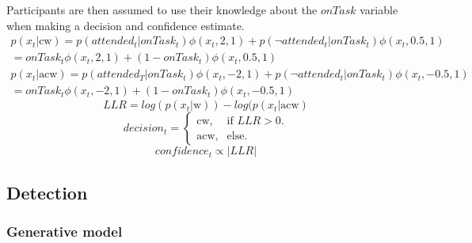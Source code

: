 \documentclass[12pt,twoside]{reedthesis}
\begin{document}
Participants are then assumed to use their knowledge about the \(onTask\) variable when making a decision and confidence estimate.
\begin{equation}
\begin{aligned}
    p(x_t | \text{cw}) = p(attended_t | onTask_t) \phi(x_t,2,1) + p(\neg attended_t | onTask_t) \phi(x_t,0.5,1)\\
    = onTask_t \phi(x_t,2,1) + (1-onTask_t) \phi(x_t,0.5,1)
    \end{aligned}
\end{equation}
\begin{equation}
\begin{aligned}
    p(x_t | \text{acw}) = p(attended_T | onTask_t) \phi(x_t,-2,1) + p(\neg attended_t | onTask_t) \phi(x_t,-0.5,1)\\
    = onTask_t \phi(x_t,-2,1) + (1-onTask_t) \phi(x_t,-0.5,1)
    \end{aligned}
\end{equation}
\begin{equation}
LLR = log(p(x_t | \text{w}))-log(p(x_t | \text{acw})
\end{equation}
\begin{equation}
  decision_t=\begin{cases}
    \text{cw}, & \text{if } LLR>0.\\
   \text{acw}, & \text{else}.
    
  \end{cases}
\end{equation}
\begin{equation}
confidence_t \propto |LLR|
\end{equation}
\hypertarget{detection-4}{%
\subsection{Detection}\label{detection-4}}

\hypertarget{generative-model-7}{%
\subsubsection*{Generative model}\label{generative-model-7}}
\end{document}
